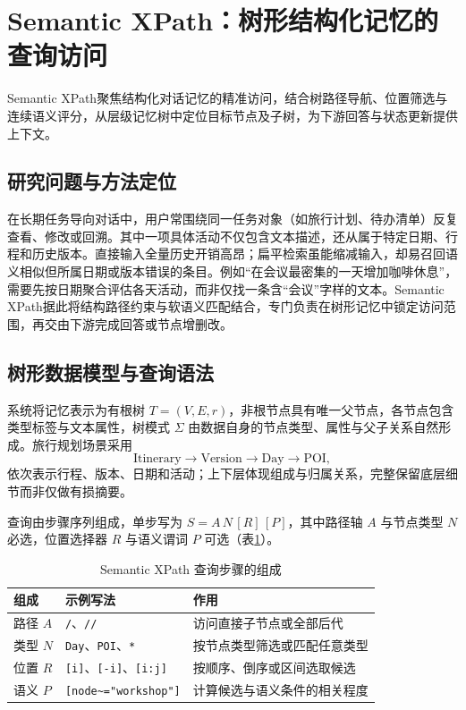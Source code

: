 \section{Semantic XPath：树形结构化记忆的查询访问}
Semantic XPath聚焦结构化对话记忆的精准访问，结合树路径导航、位置筛选与连续语义评分，从层级记忆树中定位目标节点及子树，为下游回答与状态更新提供上下文。

\subsection{研究问题与方法定位}

在长期任务导向对话中，用户常围绕同一任务对象（如旅行计划、待办清单）反复查看、修改或回溯。其中一项具体活动不仅包含文本描述，还从属于特定日期、行程和历史版本。直接输入全量历史开销高昂；扁平检索虽能缩减输入，却易召回语义相似但所属日期或版本错误的条目。例如“在会议最密集的一天增加咖啡休息”，需要先按日期聚合评估各天活动，而非仅找一条含“会议”字样的文本。Semantic XPath据此将结构路径约束与软语义匹配结合，专门负责在树形记忆中锁定访问范围，再交由下游完成回答或节点增删改。

\subsection{树形数据模型与查询语法}

系统将记忆表示为有根树 $T=(V,E,r)$，非根节点具有唯一父节点，各节点包含类型标签与文本属性，树模式 $\Sigma$ 由数据自身的节点类型、属性与父子关系自然形成。旅行规划场景采用
\[
\text{Itinerary}\rightarrow\text{Version}\rightarrow\text{Day}\rightarrow\text{POI},
\]
依次表示行程、版本、日期和活动；上下层体现组成与归属关系，完整保留底层细节而非仅做有损摘要。

查询由步骤序列组成，单步写为 $S=A\,N\,[R]\,[P]$，其中路径轴 $A$ 与节点类型 $N$ 必选，位置选择器 $R$ 与语义谓词 $P$ 可选（表\ref{tab:sxpath-grammar}）。
\begin{table}[H]
\centering
\caption{Semantic XPath 查询步骤的组成}
\label{tab:sxpath-grammar}
\begin{tabularx}{\linewidth}{@{}p{20mm}p{43mm}X@{}}
\toprule
组成 & 示例写法 & 作用 \\
\midrule
路径 $A$ & \texttt{/}、\texttt{//} & 访问直接子节点或全部后代 \\
类型 $N$ & \texttt{Day}、\texttt{POI}、\texttt{*} & 按节点类型筛选或匹配任意类型 \\
位置 $R$ & \texttt{[i]}、\texttt{[-i]}、\texttt{[i:j]} & 按顺序、倒序或区间选取候选 \\
语义 $P$ & \texttt{[node\textasciitilde="workshop"]} & 计算候选与语义条件的相关程度 \\
\bottomrule
\end{tabularx}
\end{table}

